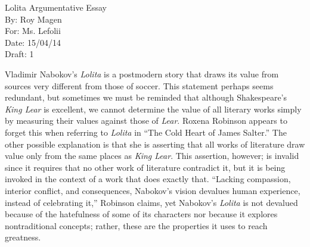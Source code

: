 \documentclass[12pt]{article}
\begin{document}
\begin{titlepage}
  \noindent Lolita Argumentative Essay \\
  By: Roy Magen \\
  For: Ms. Lefolii \\
  Date: 15/04/14 \\
  Draft: 1
\end{titlepage}
\noindent Vladimir Nabokov's \textit{Lolita} is a postmodern story that draws its value from sources very different from those of soccer. This statement perhaps seems redundant, but sometimes we must be reminded that although Shakespeare's \textit{King Lear} is excellent, we cannot determine the value of all literary works simply by measuring their values against those of \textit{Lear}. Roxena Robinson appears to forget this when referring to \textit{Lolita} in ``The Cold Heart of James Salter.'' The other possible explanation is that she is asserting that all works of literature draw value only from the same places as \textit{King Lear}. This assertion, however; is invalid since it requires that no other work of literature contradict it, but it is being invoked in the context of a work that does exactly that. ``Lacking compassion, interior conflict, and consequences, Nabokov's vision devalues human experience, instead of celebrating it,'' Robinson claims, yet Nabokov's \textit{Lolita} is not devalued because of the hatefulness of some of its characters nor because it explores nontraditional concepts; rather, these are the properties it uses to reach greatness.
\end{document}
